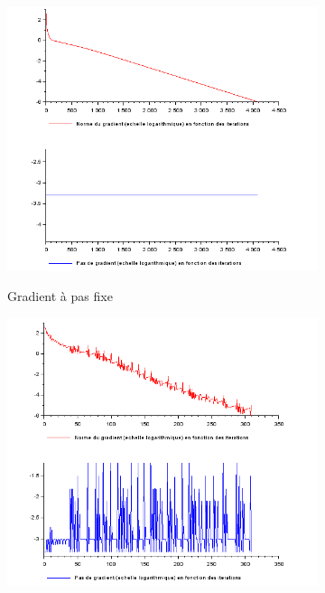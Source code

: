 \documentclass{article}
\begin{document}
    
    \begin{figure}
        \begin{subfigure}[t]{0.4\textwidth}
            \includegraphics[width=\textwidth]{../Images/Pas_fixe.png}
            \label{fig:pas_fixe}
            \caption{Gradient à pas fixe}        
        \end{subfigure}
        \hfill
        \begin{subfigure}[t]{.4\textwidth}
            \includegraphics[width=\textwidth]{../Images/Pas_variable.png}

\end{subfigure}
\end{figure}
\end{document}
